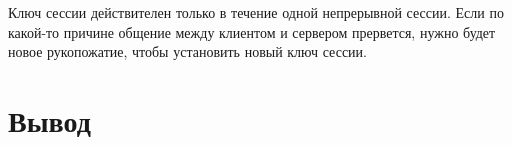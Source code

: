 Ключ сессии действителен только в течение одной непрерывной сессии. Если по какой-то причине общение между клиентом и сервером прервется, нужно будет новое рукопожатие, чтобы установить новый ключ сессии.







\section*{Вывод}

